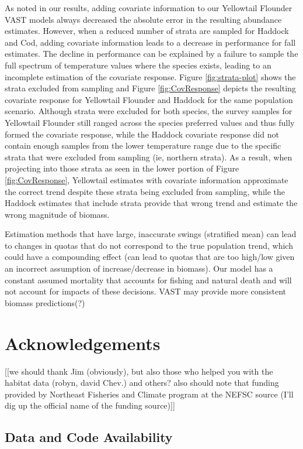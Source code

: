 \documentclass[
  12pt,
]{article}
\begin{document}
As noted in our results, adding covariate information to our Yellowtail Flounder VAST models always decreased the absolute error in the resulting abundance estimates. However, when a reduced number of strata are sampled for Haddock and Cod, adding covariate information leads to a decrease in performance for fall estimates. The decline in performance can be explained by a failure to sample the full spectrum of temperature values where the species exists, leading to an incomplete estimation of the covariate response. Figure \ref{fig:strata-plot} shows the strata excluded from sampling and Figure \ref{fig:CovResponse} depicts the resulting covariate response for Yellowtail Flounder and Haddock for the same population scenario. Although strata were excluded for both species, the survey samples for Yellowtail Flounder still ranged across the species preferred values and thus fully formed the covariate response, while the Haddock covariate response did not contain enough samples from the lower temperature range due to the specific strata that were excluded from sampling (ie, northern strata). As a result, when projecting into those strata as seen in the lower portion of Figure \ref{fig:CovResponse}, Yellowtail estimates with covariate information approximate the correct trend despite these strata being excluded from sampling, while the Haddock estimates that include strata provide that wrong trend and estimate the wrong magnitude of biomass.

Estimation methods that have large, inaccurate swings (stratified mean) can lead to changes in quotas that do not correspond to the true population trend, which could have a compounding effect (can lead to quotas that are too high/low given an incorrect assumption of increase/decrease in biomass). Our model has a constant assumed mortality that accounts for fishing and natural death and will not account for impacts of these decisions. VAST may provide more consistent biomass predictions(?)

\section{Acknowledgements}

{[}{[}we should thank Jim (obviously), but also those who helped you with the habitat data (robyn, david Chev.) and others? also should note that funding provided by Northeast Fisheries and Climate program at the NEFSC source (I'll dig up the official name of the funding source){]}{]}

\hypertarget{data-and-code-availability}{%
\subsection{Data and Code Availability}\label{data-and-code-availability}}
\end{document}

